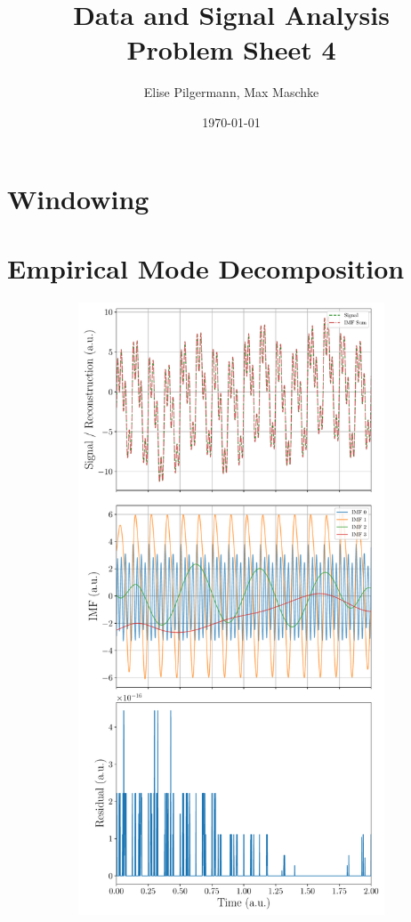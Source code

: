 \documentclass[a4paper,DIV=12,english]{scrartcl}
\title{Data and Signal Analysis\\Problem Sheet 4}
\author{Elise Pilgermann, Max Maschke}
\date{\today}
\begin{document}
\maketitle

\section{Windowing}

\section{Empirical Mode Decomposition}
\begin{figure}
    \centering
    \begin{subfigure}{0.49\textwidth}
        \centering
        \includegraphics[width=\textwidth]{../imf.pdf}

\end{subfigure}
\end{figure}
\end{document}
